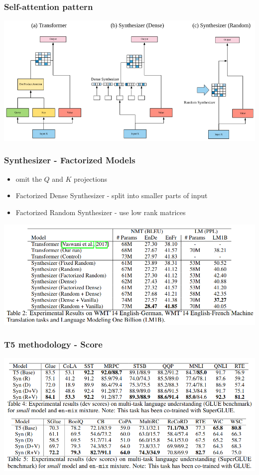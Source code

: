 \documentclass{beamer}
\begin{document}
\begin{frame}
    \frametitle{Self-attention pattern}
    \begin{center}
        \includegraphics[scale=0.38]{img/synthesizer_attention.png}
    \end{center}
\end{frame}

\begin{frame}
    \frametitle{Synthesizer - Factorized Models}
    \begin{itemize}
        \item omit the $Q$ and $K$ projections
        \item Factorized Dense Synthesizer - split into smaller parts of input
        \item Factorized Random Synthesizer - use low rank matrices
    \end{itemize}
    \begin{center}
        \includegraphics[scale=0.33]{img/synthesizer_score_params.png}
    \end{center}
\end{frame}

\begin{frame}
    \frametitle{T5 methodology - Score}
    \begin{center}
        \includegraphics[scale=0.37]{img/synthesizer_score.png}
    \end{center}
\end{frame}
\end{document}

